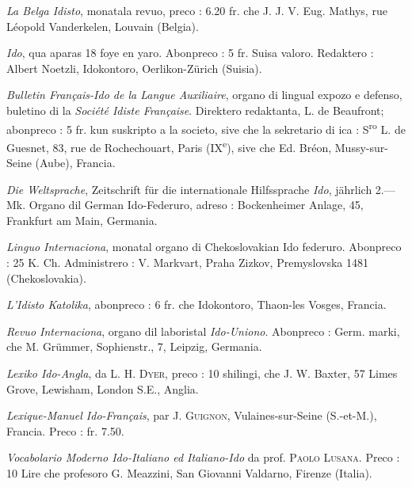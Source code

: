 \begin{VUpage}[238]{}
\VUpageSerre{8.26pt}{7.90pt}
\VUsaut{2.10mm}
\VUsaut{2.10mm}
\VUsaut{1.35mm}

\textit{La Belga Idisto}, monatala revuo, preco : 6.20 fr. che J. J. V. Eug.\nl
Mathys, rue Léopold Vanderkelen, Louvain (Belgia).

\textit{Ido}, qua aparas 18 foye en yaro. Abonpreco : 5 fr. Suisa valoro.\nl
Redaktero : Albert Noetzli, Idokontoro, Oerlikon-Zürich (Suisia).

\textit{Bulletin Français-Ido de la Langue Auxiliaire}, organo di lingual\nl
expozo e defenso, buletino di la \textit{Société Idiste Française}. Direktero\nl
redaktanta, L. de Beaufront; abonpreco : 5 fr. kun suskripto a la\nl
societo, sive che la sekretario di ica : S\textsuperscript{ro} L. de Guesnet, 83, rue de\nl
Rochechouart, Paris (IX\textsuperscript{e}), sive che Ed. Bréon, Mussy-sur-Seine\nl
(Aube), Francia.

\textit{Die Weltsprache}, Zeitschrift für die internationale Hilfssprache\nl
\textit{Ido}, jährlich 2.--- Mk. Organo dil German Ido-Federuro, adreso :\nl
Bockenheimer Anlage, 45, Frankfurt am Main, Germania.

\textit{Linguo Internaciona}, monatal organo di Chekoslovakian Ido\cc
federuro. Abonpreco : 25 K. Ch. Administrero : V. Markvart, Praha\cc
Zizkov, Premyslovska 1481 (Chekoslovakia).

\textit{L'Idisto Katolika}, abonpreco : 6 fr. che Idokontoro, Thaon-les\cc
Vosges, Francia.

\textit{Revuo Internaciona}, organo dil laboristal \textit{Ido-Uniono}. Abonpreco : Germ. marki, che M. Grümmer, Sophienstr., 7, Leipzig, Germania.

\textit{Lexiko Ido-Angla}, da L. H. \textsc{Dyer}, preco : 10 shilingi, che J. W.\nl
Baxter, 57 Limes Grove, Lewisham, London S.E., Anglia.

\textit{Lexique-Manuel Ido-Français}, par J. \textsc{Guignon}, Vulaines-sur-Seine\nl
(S.-et-M.), Francia. Preco : fr. 7.50.

\textit{Vocabolario Moderno Ido-Italiano ed Italiano-Ido} da prof. \textsc{Paolo}\nl
\textsc{Lusana}. Preco : 10 Lire che profesoro G. Meazzini, San Giovanni\nl
Valdarno, Firenze (Italia).


\end{VUpage}
